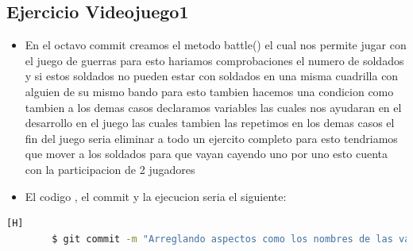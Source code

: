 \documentclass{article}
\begin{document}
	\subsection{Ejercicio Videojuego1}
	\begin{itemize}	
		\item En el octavo commit creamos el metodo battle() el cual nos permite jugar con el juego de guerras para esto hariamos comprobaciones el numero de soldados y si estos soldados no pueden estar con soldados en una misma cuadrilla con alguien de su mismo bando para esto tambien hacemos una condicion como tambien a los demas casos declaramos variables las cuales nos ayudaran en el desarrollo en el juego las cuales tambien las repetimos en los demas casos el fin del juego seria eliminar a todo un ejercito completo para esto tendriamos que mover a los soldados para que vayan cayendo uno por uno esto cuenta con la participacion de 2 jugadores 
		\item El codigo , el commit y la ejecucion seria el siguiente:
	\end{itemize}	
	\begin{lstlisting}[language=bash,caption={Commit}][H]
		$ git commit -m "Arreglando aspectos como los nombres de las variable y tambien lo mas importante la restriccion de posiciones que no existan tendran que otra vez escogeruna nueva posicion para eso aplicariamos un while y tambien dariamos un mensaje como posiciones incorrectas y tambien en el aspecto de la tabla en que se reproducia cada vez en el do whie() para esto la sacamos afuera para que solo fuera una vez"
	\end{lstlisting}	
\end{document}
